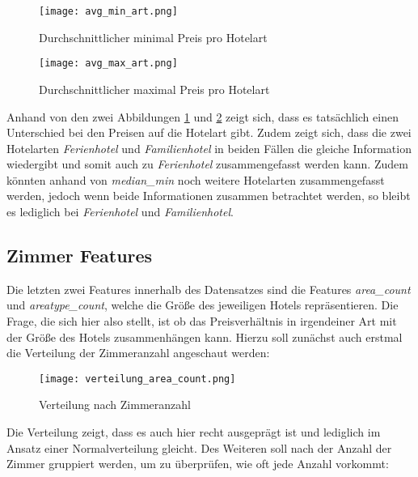\begin{figure}[h]
    \centering
    \texttt{[image: avg\_min\_art.png]}
    \caption[Durchschnittlicher minimal Preis pro Hotelart]{Durchschnittlicher minimal Preis pro Hotelart}
    \label{img:avg_min_art}
\end{figure}
\newpage
\begin{figure}[h]
    \centering
    \texttt{[image: avg\_max\_art.png]}
    \caption[Durchschnittlicher maximal Preis pro Hotelart]{Durchschnittlicher maximal Preis pro Hotelart}
    \label{img:avg_max_art}
\end{figure}

Anhand von den zwei Abbildungen \ref{img:avg_min_art} und \ref{img:avg_max_art} zeigt sich, dass es tatsächlich einen Unterschied bei den Preisen auf die Hotelart gibt. Zudem zeigt sich, dass die zwei Hotelarten \emph{Ferienhotel} und \emph{Familienhotel} in beiden Fällen die gleiche Information wiedergibt und somit auch zu \emph{Ferienhotel} zusammengefasst werden kann. Zudem könnten anhand von \emph{median\_min} noch weitere Hotelarten zusammengefasst werden, jedoch wenn beide Informationen zusammen betrachtet werden, so bleibt es lediglich bei \emph{Ferienhotel} und \emph{Familienhotel}.

\subsection{Zimmer Features}
Die letzten zwei Features innerhalb des Datensatzes sind die Features \emph{area\_count} und \emph{areatype\_count}, welche die Größe des jeweiligen Hotels repräsentieren. Die Frage, die sich hier also stellt, ist ob das Preisverhältnis in irgendeiner Art mit der Größe des Hotels zusammenhängen kann. Hierzu soll zunächst auch erstmal die Verteilung der Zimmeranzahl angeschaut werden:
\newpage
\begin{figure}[h]
    \centering
    \texttt{[image: verteilung\_area\_count.png]}
    \caption[Verteilung nach Zimmeranzahl]{Verteilung nach Zimmeranzahl}
    \label{img:verteilung_area_count}
\end{figure}

Die Verteilung zeigt, dass es auch hier recht ausgeprägt ist und lediglich im Ansatz einer Normalverteilung gleicht. Des Weiteren soll nach der Anzahl der Zimmer gruppiert werden, um zu überprüfen, wie oft jede Anzahl vorkommt:

